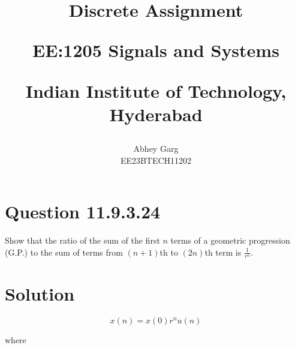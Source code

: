 \documentclass[journal,12pt,twocolumn]{IEEEtran}
\theoremstyle{remark}
\begin{document}
%




\vspace{3cm}

\title{
Discrete Assignment 

\large{EE:1205 Signals and Systems}

Indian Institute of Technology, Hyderabad
}
\author{Abhey Garg

EE23BTECH11202
}	


\maketitle

\newpage


\bigskip

\renewcommand{\thefigure}{\theenumi}
\renewcommand{\thetable}{\theenumi}

\section{Question 11.9.3.24}
Show that the ratio of the sum of the first \(n\) terms of a geometric progression (G.P.) to the sum of terms from \((n+1)\)th to \((2n)\)th term is \(\frac{1}{r^n}\).
\section{Solution}
\fi

\begin{equation}
x(n) = x(0) r^n u(n)
\end{equation}

where
\end{document}
